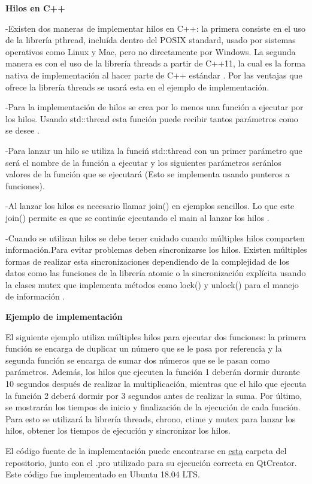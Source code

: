 \documentclass[a4paper,11pt]{article}
\begin{document}
{\large\bfseries Hilos en C++} 

-Existen dos maneras de implementar hilos en C++: la primera consiste en el uso de la librería pthread, incluída dentro del POSIX standard, usado por sistemas operativos como Linux y Mac, pero no directamente por Windows. La segunda manera es con el uso de la librería threads a partir de C++11, la cual es la forma nativa de implementación al hacer parte de C++ estándar \cite[p.284]{swaminathan2018expert}.
Por las ventajas que ofrece la librería threads se usará esta en el ejemplo de implementación.

-Para la implementación de hilos se crea por lo menos una función a ejecutar por los hilos. Usando std::thread esta función puede recibir tantos parámetros como se desee \cite[p.748]{gregoire2014professional}.

-Para lanzar un hilo se utiliza la funciń std::thread con un primer parámetro que será el nombre de la función a ejecutar y los siguientes parámetros seránlos valores de la función que se ejecutará (Esto se implementa usando punteros a funciones)\cite[p.748]{gregoire2014professional}.

-Al lanzar los hilos es necesario llamar join() en ejemplos sencillos. Lo que este join() permite es que se continúe ejecutando el main al lanzar los hilos \cite[p.748]{gregoire2014professional}.

-Cuando se utilizan hilos se debe tener cuidado cuando múltiples hilos comparten información.Para evitar problemas deben sincronizarse los hilos. Existen múltiples formas de realizar esta sincronizaciones dependiendo de la complejidad de los datos como las funciones de la librería atomic \cite[p.758]{gregoire2014professional} o la sincronización explícita usando la clases mutex que implementa métodos como lock() y unlock() para el manejo de información \cite[p.759]{gregoire2014professional}.

{\large\bfseries Ejemplo de implementación}

El siguiente ejemplo utiliza múltiples hilos para ejecutar dos funciones: la primera función se encarga de duplicar un número que se le pasa por referencia y la segunda función se encarga de sumar dos números que se le pasan como parámetros. Además, los hilos que ejecuten la función 1 deberán dormir durante 10 segundos después de
realizar la multiplicación, mientras que el hilo que ejecuta la función 2 deberá dormir por 3 segundos antes de realizar la suma.
Por último, se mostrarán los tiempos de inicio y finalización de la ejecución de cada función.
Para esto se utilizará la librería threads, chrono, ctime y mutex para lanzar los hilos, obtener los tiempos de ejecución y sincronizar los hilos.

El código fuente de la implementación puede encontrarse en \href{https://github.com/AndreaOspinaHincapie/Informatica2/tree/master/Proyectos%20de%20investigaci%C3%B3n/Hilos/Hilos}{\underline {esta}}
 carpeta del repositorio, junto con el .pro utilizado para su ejecución correcta en QtCreator. Este código fue implementado en Ubuntu 18.04 LTS.

\newpage

\renewcommand\refname{REFERENCIAS BIBLIOGRÁFICAS}
%


\end{document}
